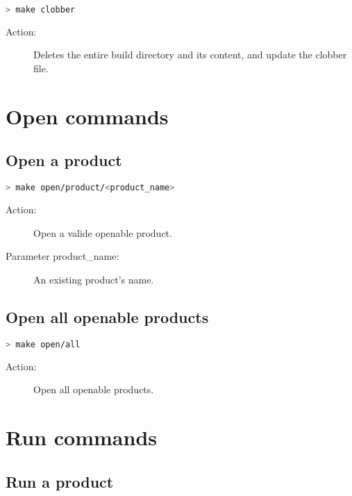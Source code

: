 \begin{lstlisting}[language=bash]
> make clobber
\end{lstlisting}

\begin{description}
    \item[Action:] Deletes the entire build directory and its content, and update the clobber file.
\end{description}


\section{Open commands}

\subsection{Open a product}

\begin{lstlisting}[language=bash]
> make open/product/<product_name>
\end{lstlisting}

\begin{description}
    \item[Action:] Open a valide openable product.
    \item[Parameter product\_name:] An existing product's name.
\end{description}


\subsection{Open all openable products}

\begin{lstlisting}[language=bash]
> make open/all
\end{lstlisting}

\begin{description}
    \item[Action:] Open all openable products.
\end{description}


\section{Run commands}

\subsection{Run a product}

